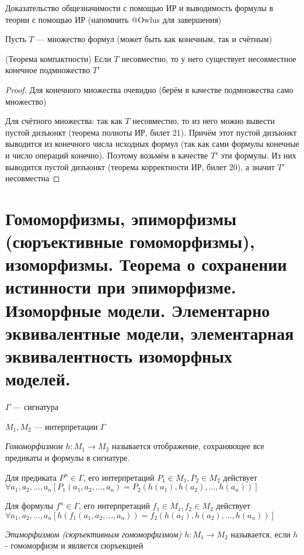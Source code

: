 \documentclass{article}
\begin{document}
Доказательство общезначимости с помощью ИР и выводимость формулы в теории с помощью ИР (напомнить @Owlus для завершения)

Пусть $T$ --- множество формул (может быть как конечным, так и счётным)
\begin{theorem}{(Теорема компактности)}
	Если $T$ несовместно, то у него существует несовместное конечное подмножество $T'$
\end{theorem}

\begin{proof}
    Для конечного множества очевидно (берём в качестве подмножества само множество)
	
	Для счётного множества: так как $T$ несовместно, то из него можно вывести пустой дизъюнкт (теорема полноты ИР, билет 21). Причём этот пустой дизъюнкт выводится из конечного числа исходных формул (так как сами формулы конечные и число операций конечно). Поэтому возьмём в качестве $T'$ эти формулы. Из них выводится пустой дизъюнкт (теорема корректности ИР, билет 20), а значит $T'$ несовместна
\end{proof}

\section{Гомоморфизмы, эпиморфизмы (сюръективные гомоморфизмы), изоморфизмы. Теорема о сохранении истинности при эпиморфизме. Изоморфные модели. Элементарно эквивалентные модели, элементарная эквивалентность изоморфных моделей.}
$\Gamma$ --- сигнатура

$M_1, M_2$ --- интерпретации $\Gamma$
\begin{definition}
	\textit{Гомоморфизмом $h: M_1 \rightarrow M_2$} называется отображение, сохраняющее все предикаты и формулы в сигнатуре. 
	
	Для предиката $P^n \in \Gamma$, его интерпретаций $P_1 \in M_1, P_2 \in M_2$ действует \\
	$\forall a_1, a_2,..., a_n[P_1(a_1, a_2,..., a_n) = P_2(h(a_1), h(a_2),..., h(a_n))]$
	
	Для формулы $f^n \in \Gamma$, его интерпретаций $f_1 \in M_1, f_2 \in M_2$ действует \\
	$\forall a_1, a_2,..., a_n[h(f_1(a_1, a_2,..., a_n)) = f_2(h(a_1), h(a_2),..., h(a_n))]$
\end{definition}

\begin{definition}
	\textit{Эпиморфизмом (сюръективным гомоморфизмом) $h: M_1 \rightarrow M_2$} называется, если $h$ - гомоморфизм и является сюръекцией
\end{definition}
\end{document}
